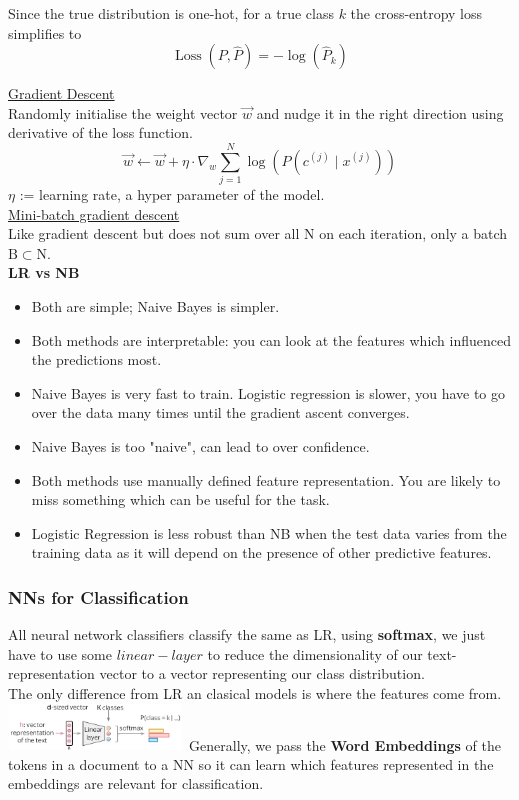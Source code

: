 \documentclass[8pt]{extarticle} %
\begin{document}
\begin{multicols*}{3}
Since the true distribution is one-hot, for a true class $k$ the cross-entropy loss simplifies to
$$\operatorname{Loss}\left(P, \hat{P}\right)=-\log \left(\hat{P}_k\right)$$

\underline{Gradient Descent}\\
Randomly initialise the weight vector $\vec{w}$ and nudge it in the right direction using derivative of the loss function.
$$
\vec{w} \leftarrow \vec{w}+\eta \cdot \nabla_w \sum_{j=1}^N \log \left(P\left(c^{(j)} \mid x^{(j)}\right)\right)
$$
$\eta$ := learning rate, a hyper parameter of the model. \\

\underline{Mini-batch gradient descent}\\
Like gradient descent but does not sum over all $\mathrm{N}$ on each iteration, only a batch $\mathrm{B}\subset\mathrm{N}$.\\

\textbf{LR vs NB}
\begin{itemize}[label=\textbullet, labelsep=0.3em, leftmargin=0.5em, itemsep=0em]
    \item Both are simple; Naive Bayes is simpler.
    \item Both methods are interpretable: you can look at the features which influenced the predictions most.
    \item Naive Bayes is very fast to train. Logistic regression is slower, you have to go over the data many times until the gradient ascent converges.
    \item Naive Bayes is too "naive", can lead to over confidence. 
    \item Both methods use manually defined feature representation. You are likely to miss something which can be useful for the task.
    \item Logistic Regression is less robust than NB when the test data varies from the training data as it will depend on the presence of other predictive features.
\end{itemize}

\subsubsection*{NNs for Classification}
All neural network classifiers classify the same as LR, using \textbf{softmax}, we just have to use some $linear-layer$ to reduce the dimensionality of our text-representation vector to a vector representing our class distribution. \\
The only difference from LR an clasical models is where the features come from. \\
\includegraphics[width=0.35\textwidth]{media/nn-classifier.png}
Generally, we pass the \textbf{Word Embeddings} of the tokens in a document to a NN so it can learn which features represented in the embeddings are relevant for classification. 


\end{multicols*}
\end{document}
